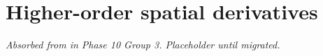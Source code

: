 \chapter{Higher-order spatial derivatives}
\label{chap:higher-order-derivatives}

\textit{Absorbed from
 in
Phase 10 Group 3. Placeholder until migrated.}
